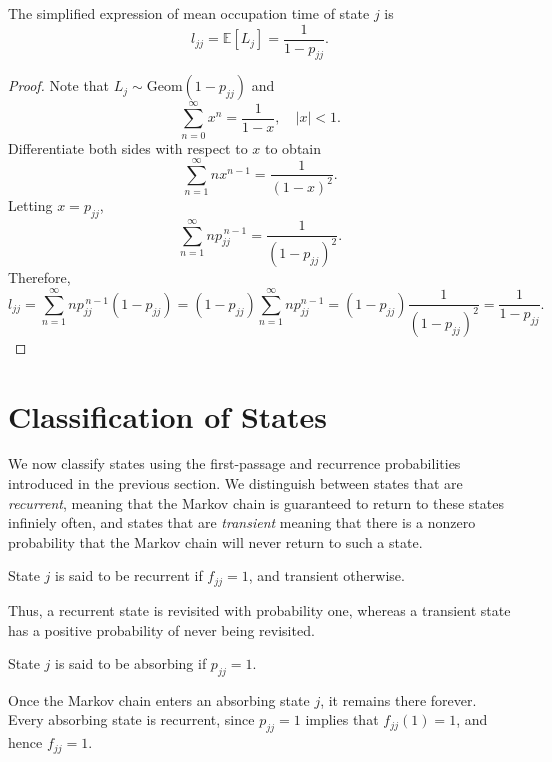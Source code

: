 \documentclass[../Note.tex]{subfiles}
\begin{document}
\begin{proposition}
    The simplified expression of mean occupation time of state $j$ is
    \begin{equation}
        l_{jj}=\mathbb{E}[L_j]=\frac{1}{1-p_{jj}}.
    \end{equation} 
\end{proposition}

\begin{proof}
    Note that $L_{j} \sim \mathrm{Geom}(1 - p_{jj})$ and 
    \[
        \sum_{n=0}^{\infty}x^n = \frac{1}{1-x}, \quad |x|<1.
    \]
    Differentiate both sides with respect to $x$ to obtain
    \[
        \sum_{n=1}^{\infty} n x^{n-1}=\frac{1}{(1-x)^2}.
    \]
    Letting $x=p_{jj}$,
    \[
        \sum_{n=1}^{\infty}n p_{jj}^{\,n-1}=\frac{1}{(1-p_{jj})^2}.
    \]
    Therefore,
    \[ 
        l_{jj}=\sum_{n=1}^{\infty}n p_{jj}^{\,n-1}(1-p_{jj}) =(1-p_{jj})\sum_{n=1}^{\infty}n p_{jj}^{n-1} =(1-p_{jj})\frac{1}{(1-p_{jj})^2} =\frac{1}{1-p_{jj}}. 
    \]
\end{proof}


\section{Classification of States}

We now classify states using the first-passage and recurrence probabilities introduced in the previous section. We distinguish between states that are \textit{recurrent}, meaning that the Markov chain is guaranteed to return to these states infiniely often, and states that are \textit{transient} meaning that there is a nonzero probability that the Markov chain will never return to such a state. 

\begin{definition}
    State $j$ is said to be recurrent if $f_{jj} = 1$, and transient otherwise. 
\end{definition}

Thus, a recurrent state is revisited with probability one, whereas a transient state has a positive probability of never being revisited.

\begin{definition}
    State $j$ is said to be absorbing if $p_{jj}=1$. 
\end{definition}

Once the Markov chain enters an absorbing state $j$, it remains there forever. Every absorbing state is recurrent, since $p_{jj}=1$ implies that $f_{jj}(1)=1$, and hence $f_{jj}=1$.
\end{document}
